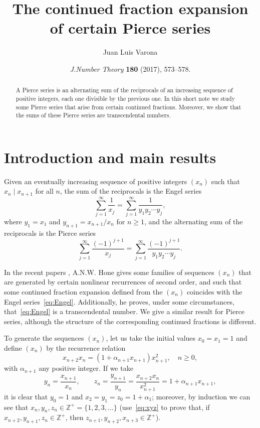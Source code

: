 \documentclass[11pt, a4paper]{amsart}
\title{The continued fraction expansion of certain Pierce series}
\author{Juan Luis Varona}
\date{\textit{J.\@ Number Theory} \textbf{180} (2017), 573--578.}
\newcommand{\Zp}{\mathbb{Z}^{+}}
\theoremstyle{plain}
\theoremstyle{remark}
\begin{document}

\begin{abstract}
A Pierce series is an alternating sum of the reciprocals of an increasing sequence of positive integers, each one divisible by the previous one. In this short note we study some Pierce series that arise from certain continued fractions. Moreover, we show that the sums of these Pierce series are transcendental numbers. 
\end{abstract}

\maketitle

\section{Introduction and main results}
\label{sec:intro}

Given an eventually increasing sequence of positive integers $(x_n)$ such that $x_n \mid x_{n+1}$ for all $n$, the sum of the reciprocals is the Engel series
\begin{equation}
\label{eq:Engel}
  \sum_{j=1}^{\infty} \frac{1}{x_j}
  = \sum_{j=1}^{\infty} \frac{1}{y_1y_2 \cdots y_j},
\end{equation}
where $y_1 = x_1$ and $y_{n+1} = x_{n+1}/x_n$ for $n \ge 1$,
and the alternating sum of the reciprocals is the Pierce series
\begin{equation}
\label{eq:Pierce}
  \sum_{j=1}^{\infty} \frac{(-1)^{j+1}}{x_j}
  = \sum_{j=1}^{\infty} \frac{(-1)^{j+1}}{y_1y_2 \cdots y_j}.
\end{equation}

In the recent papers \cite{Hone1, Hone2}, A.N.W. Hone gives some families of sequences $(x_n)$ that are generated by certain nonlinear recurrences of second order, and such that some continued fraction expansion defined from the $(x_n)$ coincides with the Engel series~\eqref{eq:Engel}. Additionally, he proves, under some circumstances, that~\eqref{eq:Engel} is a transcendental number. 
We give a similar result for Pierce series, although the structure of the corresponding continued fractions is different.

To generate the sequences $(x_n)$, let us take the initial values $x_0 = x_1 = 1$ and define $(x_n)$ by the recurrence relation
\begin{equation}
\label{eq:rec}
  x_{n+2}x_n = (1+\alpha_{n+1}x_{n+1})x_{n+1}^2, \quad n \ge 0,
\end{equation}
with $\alpha_{n+1}$ any positive integer.
If we take
\begin{equation}
\label{eq:xyz}
  y_n = \frac{x_{n+1}}{x_n},
  \qquad
  z_n = \frac{y_{n+1}}{y_n} = \frac{x_{n+2}x_n}{x_{n+1}^2} = 1+\alpha_{n+1}x_{n+1},
\end{equation}
it is clear that $y_0=1$ and $x_2=y_1=z_0=1+\alpha_1$; moreover, by induction we can see that $x_n,y_n,z_n \in \Zp = \{1,2,3,\dots\}$ (use~\eqref{eq:xyz} to prove that, if $x_{n+2},y_{n+1},z_n \in \Zp$, then $z_{n+1},y_{n+2},x_{n+3} \in \Zp$). 
\end{document}
